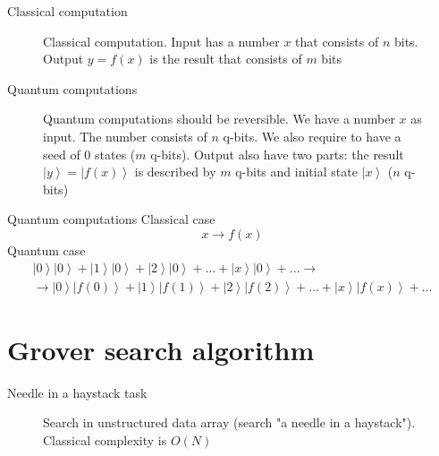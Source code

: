 \documentclass[10pt,pdf,hyperref={unicode}]{beamer}
\begin{document}
\begin{frame}{Classical computation}
\begin{figure}
\centering



\caption{Classical computation. Input has a number $x$ that consists
  of  $n$ bits. Output $y = f\left(x\right)$ is the result that
  consists of $m$ bits}
\label{figQuantCompClassComp}
\end{figure}
\end{frame}

\begin{frame}{Quantum computations}
\begin{figure}
\centering

\scalebox{.8}{}

\caption{Quantum computations should be reversible. We have a number
  $x$ as input. The number consists of $n$ q-bits. We also require to
  have a seed of $0$ states ($m$ q-bits). Output also have two parts: the result $\left|y\right> =
  \left|f\left(x\right)\right>$ is described by $m$ q-bits and initial
  state $\left|x\right>$ ($n$ q-bits)} 
\label{figQuantCompQuantComp}
\end{figure}
\end{frame}


\begin{frame}{Quantum computations}
Classical case
\[
x \to f(x)
\]
Quantum case
\begin{eqnarray}
\left|0\right>\left|0\right> + \left|1\right>\left|0\right> + \left|2\right>\left|0\right> +
\dots + \left|x\right>\left|0\right> + \dots \to
\nonumber \\
\to 
\left|0\right>\left|f(0)\right> + \left|1\right>\left|f(1)\right> + \left|2\right>\left|f(2)\right> +
\dots + \left|x\right>\left|f(x)\right> + \dots
\nonumber
\end{eqnarray}
\end{frame}


\section{Grover search algorithm}
\begin{frame}{Needle in a haystack task}
\begin{figure}
\centering



\caption{Search in unstructured data array (search "a needle in a
  haystack"). Classical complexity is $O(N)$}
\label{figQuantCompSearch}
\end{figure}
\end{frame}
\end{document}
